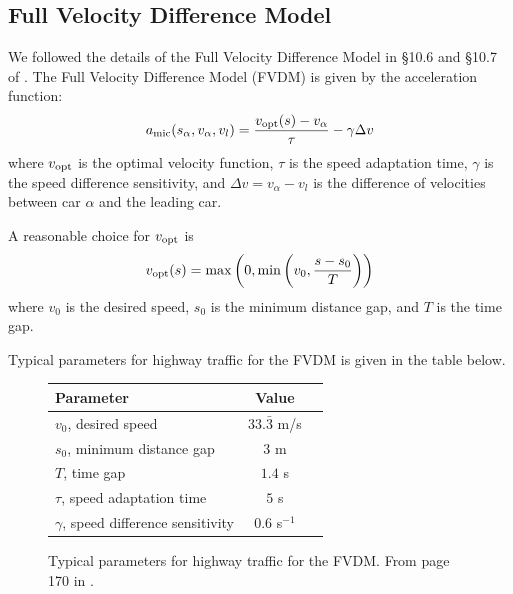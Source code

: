 \documentclass[12pt]{article}
\begin{document}
    \subsection{Full Velocity Difference Model}\label{ch3.1}
    We followed the details of the Full Velocity Difference Model in \S 10.6 and \S 10.7 of \cite{traffic}. The Full Velocity Difference Model (FVDM) is given by the acceleration function: 
    \begin{equation}\label{a_mic}
      a_{\rm mic}(s_\alpha,v_\alpha,v_l) = \frac{v_{\rm opt} (s) - v_\alpha}{\tau} - \gamma \Delta v 
    \end{equation}
    where $v_{\rm opt}$ is the optimal velocity function, $\tau$ is the speed adaptation time, $\gamma$ is the speed difference sensitivity, and $\Delta v = v_\alpha - v_l$ is the difference of velocities between car $\alpha$ and the leading car.
    
    A reasonable choice for $v_{\rm opt}$ is 
    \begin{equation} 
      v_{\rm opt} (s) = \max \left( 0, \min \left( v_0, \frac{s-s_0}{T} \right) \right)
    \end{equation}
    where $v_0$ is the desired speed, $s_0$ is the minimum distance gap, and $T$ is the time gap. 

    Typical parameters for highway traffic for the FVDM is given in the table below. 
    \begin{figure}[H]
      \begin{center}
        \begin{tabular}{l c c } 
        Parameter & Value \\
        \hline
        $v_0$, desired speed & $33.\bar{3}$ m/s \\
        $s_0$, minimum distance gap & $3$ m \\
        $T$, time gap & $1.4$ s \\
        $\tau$, speed adaptation time & $5$ s \\
        $\gamma$, speed difference sensitivity & $0.6$ s$^{-1}$ \\
        \end{tabular}
        \end{center}
        \caption{Typical parameters for highway traffic for the FVDM. From page 170 in \cite{traffic}.}
        \label{fig:parameters}
    \end{figure}
    
\end{document}
